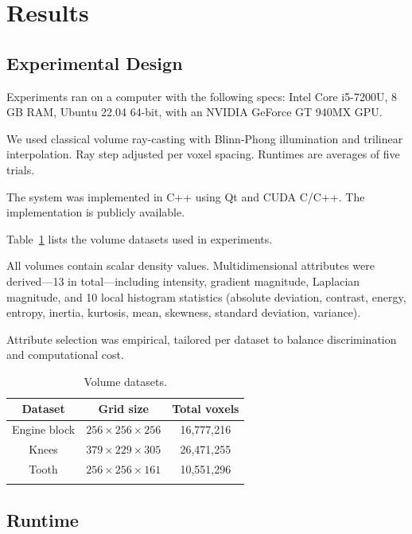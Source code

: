 \section{Results}
\label{sect:results}

\subsection{Experimental Design}
\label{subsect:experimental-design}

Experiments ran on a computer with the following specs: Intel Core i5-7200U, 8 GB RAM, Ubuntu 22.04 64-bit, with an NVIDIA GeForce GT 940MX GPU.

We used classical volume ray-casting with Blinn-Phong illumination and trilinear interpolation. Ray step adjusted per voxel spacing. Runtimes are averages of five trials.

The system was implemented in C++ using Qt and CUDA C/C++. The implementation is publicly available.

Table~\ref{tab:datasets-descriptions} lists the volume datasets used in experiments.

All volumes contain scalar density values. Multidimensional attributes were derived—13 in total—including intensity, gradient magnitude, Laplacian magnitude, and 10 local histogram statistics (absolute deviation, contrast, energy, entropy, inertia, kurtosis, mean, skewness, standard deviation, variance).

Attribute selection was empirical, tailored per dataset to balance discrimination and computational cost.

\begin{table}[htb!]
    \centering
    \caption{Volume datasets.}
    \begin{tabular}{@{}ccc@{}}
        \toprule
        \textbf{Dataset} & \textbf{Grid size} & \textbf{Total voxels} \\ 
        \midrule
        Engine block & $256 \times 256 \times 256$ & 16,777,216\\
        Knees & $379 \times 229 \times 305$ & 26,471,255\\
        Tooth & $256 \times 256 \times 161$ & 10,551,296\\
        \bottomrule
        \label{tab:datasets-descriptions}
    \end{tabular}
\end{table}

\subsection{Runtime}
\label{subsect:runtime-analysis}


